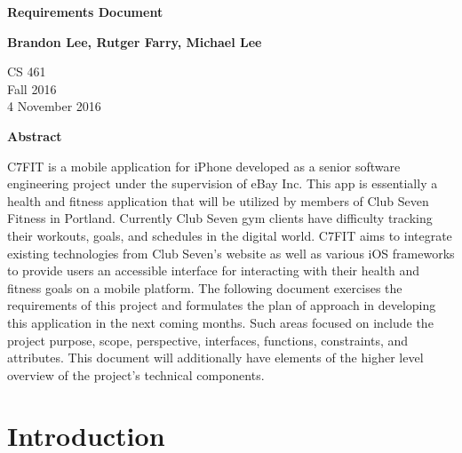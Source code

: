 \documentclass[letterpaper,10pt,titlepage]{article}
\begin{document}
\begin{titlepage}
    \begin{center}
        \vspace*{3.5cm}

        \textbf{Requirements Document}

        \vspace{0.5cm}

        \textbf{Brandon Lee, Rutger Farry, Michael Lee}

        \vspace{0.8cm}

        CS 461\\
        Fall 2016\\
        4 November 2016\\

        \vspace{1cm}

        \textbf{Abstract}\\

        \vspace{0.5cm}

        C7FIT is a mobile application for iPhone developed as a senior software engineering project under the supervision of eBay Inc. This app is essentially a health and fitness application that will be utilized by members of Club Seven Fitness in Portland. Currently Club Seven gym clients have difficulty tracking their workouts, goals, and schedules in the digital world. C7FIT aims to integrate existing technologies from Club Seven’s website as well as various iOS frameworks to provide users an accessible interface for interacting with their health and fitness goals on a mobile platform. The following document exercises the requirements of this project and formulates the plan of approach in developing this application in the next coming months. Such areas focused on include the project purpose, scope, perspective, interfaces, functions, constraints, and attributes. This document will additionally have elements of the higher level overview of the project’s technical components.

        \vfill

    \end{center}
\end{titlepage}

\newpage

\tableofcontents

\newpage

\section{Introduction}
\end{document}
